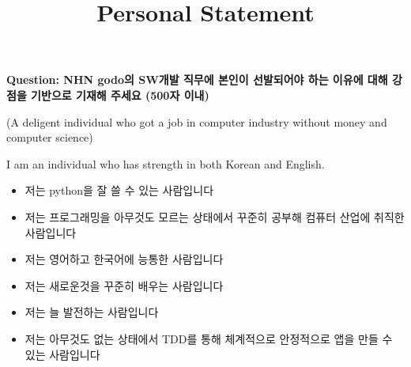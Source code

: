 \documentclass[12pt]{article}
\begin{document}
\title{Personal Statement}
\maketitle

\textbf{Question: NHN godo의 SW개발 직무에 본인이 선발되어야 하는 이유에 대해 강점을 기반으로 기재해 주세요 (500자 이내)}

\bigskip

(A deligent individual who got a job in computer industry without money and computer science)

I am an individual who has strength in both Korean and English.

\begin{itemize}
    \item 저는 python을 잘 쓸 수 있는 사람입니다
    \item 저는 프로그래밍을 아무것도 모르는 상태에서 꾸준히 공부해 컴퓨터 산업에 취직한 사람입니다
    \item 저는 영어하고 한국어에 능통한 사람입니다
    \item 저는 새로운것을 꾸준히 배우는 사람입니다
    \item 저는 늘 발전하는 사람입니다
    \item 저는 아무것도 없는 상태에서 TDD를 통해 체계적으로 안정적으로 앱을 만들 수 있는 사람입니다
\end{itemize}
\end{document}
